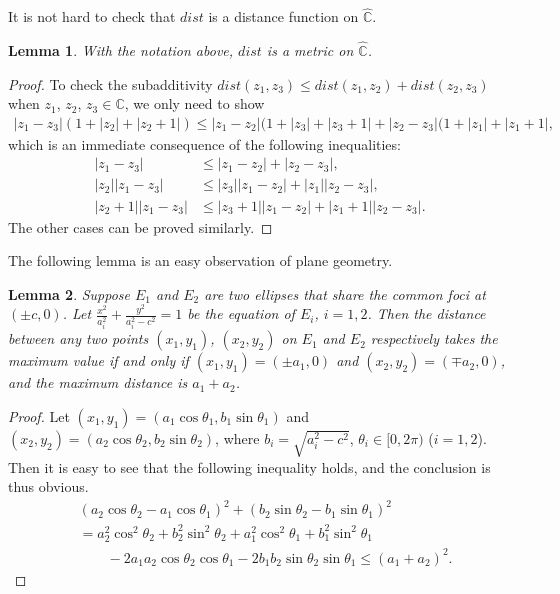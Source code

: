 \documentclass{amsart}
\newcommand{\C}{\mathbb C} %
\newtheorem{lemma}{Lemma}[section]
\begin{document}
It is not hard to check that $dist$ is a distance function on $\widehat{\C}$.

\begin{lemma}
With the notation above, $dist$ is a metric on $\widehat{\C}$.
\end{lemma}

\begin{proof}
To check the subadditivity $dist(z_1 , z_3) \leq dist(z_1, z_2) + dist(z_2, z_3)$ when $z_1$, $z_2$, $z_3 \in \C$, we only need to show 
\begin{align*}
|z_1 - z_3|(1 + |z_2| + |z_2 + 1|) \leq |z_1 - z_2|(1 + |z_3| + |z_3 + 1| + |z_2 - z_3|(1 + |z_1| + |z_1 + 1|,
\end{align*}
which is an immediate consequence of the following inequalities: 
\begin{align*}
|z_1 - z_3| &\leq |z_1 - z_2| + |z_2 - z_3|, \\
|z_2||z_1 - z_3| &\leq |z_3||z_1 - z_2| + |z_1||z_2 - z_3|,\\
|z_2 + 1||z_1 - z_3| &\leq |z_3 + 1||z_1 - z_2| + |z_1 + 1||z_2 - z_3|.
\end{align*}
The other cases can be proved similarly.
\end{proof}

The following lemma is an easy observation of plane geometry.

\begin{lemma}\label{3lemma5}
Suppose $E_1$ and $E_2$ are two ellipses that share the common foci at $(\pm c, 0)$.
Let $\frac{x^2}{a_{i}^{2}} + \frac{y^2}{a_{i}^2 - c^2} = 1$ be the equation of $E_i$, $i = 1,2 $.
Then the distance between any two points $(x_1, y_1)$, $(x_2, y_2)$ on $E_1$ and $E_2$ respectively takes the maximum value if
and only if $(x_1, y_1) = (\pm a_1, 0)$ and $(x_2, y_2) = (\mp a_2, 0)$, and the maximum distance is $a_1 + a_2$.
\end{lemma}

\begin{proof}
Let $(x_1, y_1) = (a_1 \cos\theta_1, b_1 \sin \theta_1)$ and $(x_2, y_2) = (a_2 \cos\theta_2, b_2 \sin \theta_2)$, where
$b_i = \sqrt{a_{i}^{2} - c^2}$, $\theta_i \in [0, 2\pi)$ ($i = 1,2$). Then it is easy to see that the following inequality holds, and the conclusion is thus obvious.  
\begin{align*}
&(a_2 \cos\theta_2 - a_1 \cos\theta_1)^2 + ( b_2 \sin \theta_2 -  b_1 \sin \theta_1)^2 \\
&= a_{2}^{2} \cos^{2}\theta_{2} + b^{2}_2 \sin^{2} \theta_2 + a_{1}^{2} \cos^{2}\theta_{1} +  b^{2}_1 \sin^{2} \theta_1 \\
& \qquad   -2a_1 a_2 \cos\theta_{2} \cos\theta_{1} - 2b_1 b_2 \sin \theta_2 \sin \theta_1 \leq (a_1 + a_2)^2.
\end{align*}
\end{proof}
\end{document}
